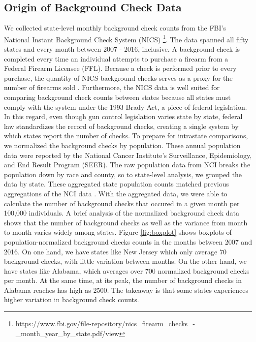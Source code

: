 \documentclass[9pt,twocolumn,twoside,lineno]{pnas-new}
\begin{document}
\subsection{Origin of Background Check Data}

We collected state-level monthly background check counts from the FBI’s National Instant Background Check System (NICS) \footnote{https://www.fbi.gov/file-repository/nics\_firearm\_checks\_-\_month\_year\_by\_state.pdf/view}. The data spanned all fifty states and every month between 2007 - 2016, inclusive. A background check is completed every time an individual attempts to purchase a firearm from a Federal Firearm Licensee  (FFL). Because a check is performed prior to every purchase, the quantity of NICS background checks serves as a proxy for the number of firearms sold \cite{PBL}. 
	Furthermore, the NICS data is well suited for comparing background check counts between states because all states must comply with the system under the 1993 Brady Act, a piece of federal legislation. In this regard, even though gun control legislation varies state by state, federal law standardizes the record of background checks, creating a single system by which states report the number of checks. 
	To prepare for intrastate comparisons, we normalized the background checks by population. These annual population data were reported by the National Cancer Institute’s Surveillance, Epidemiology, and End Result Program (SEER). The raw population data  from NCI breaks the population down by race and county, so to state-level analysis, we grouped the data by state. These aggregated state population counts matched previous aggregations of the NCI data \cite{levine_firearms_2017}. With the aggregated data, we were able to calculate the number of background checks that occured in a given month per 100,000 individuals. 
    A brief analysis of the normalized background check data shows that the number of background checks as well as the variance from month to month varies widely among states. Figure \ref{fig:boxplot} shows boxplots of population-normalized background checks counts in the months between 2007 and 2016. On one hand, we have states like New Jersey which only average 70 background checks, with little variation between months. On the other hand, we have states like Alabama, which averages over 700 normalized background checks per month. At the same time, at its peak, the number of background checks in Alabama reaches has high as 2500. The takeaway is that some states experiences higher variation in background check counts. 
\end{document}
